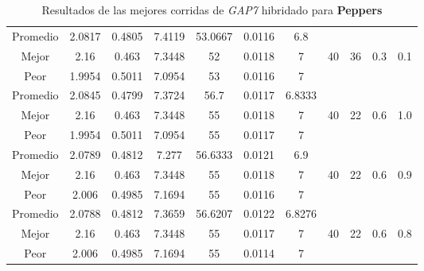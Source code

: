 \begin{table}[h!]
\begin{center}
\begin{tabular}{|c|c|c|c|c|c|c|c|c|c|c|}
        \hline
        \hline
            Promedio  & 2.0817 & 0.4805 & 7.4119 & 53.0667 & 0.0116 & 6.8 &  &  &  & \\
            \cline{1-7}
            Mejor & 2.16 & 0.463  & 7.3448 & 52 & 0.0118 & 7 & 40 & 36 & 0.3 & 0.1\\
            \cline{1-7}
            Peor & 1.9954 & 0.5011  & 7.0954 & 53 & 0.0116 & 7 &  &  &  & \\
        \hline
        \hline
            Promedio  & 2.0845 & 0.4799 & 7.3724 & 56.7 & 0.0117 & 6.8333 &  &  &  & \\
            \cline{1-7}
            Mejor & 2.16 & 0.463  & 7.3448 & 55 & 0.0118 & 7 & 40 & 22 & 0.6 & 1.0\\
            \cline{1-7}
            Peor & 1.9954 & 0.5011  & 7.0954 & 55 & 0.0117 & 7 &  &  &  & \\
        \hline
        \hline
            Promedio  & 2.0789 & 0.4812 & 7.277 & 56.6333 & 0.0121 & 6.9 &  &  &  & \\
            \cline{1-7}
            Mejor & 2.16 & 0.463  & 7.3448 & 55 & 0.0118 & 7 & 40 & 22 & 0.6 & 0.9\\
            \cline{1-7}
            Peor & 2.006 & 0.4985  & 7.1694 & 55 & 0.0116 & 7 &  &  &  & \\
        \hline
        \hline
            Promedio  & 2.0788 & 0.4812 & 7.3659 & 56.6207 & 0.0122 & 6.8276 &  &  &  & \\
            \cline{1-7}
            Mejor & 2.16 & 0.463  & 7.3448 & 55 & 0.0117 & 7 & 40 & 22 & 0.6 & 0.8\\
            \cline{1-7}
            Peor & 2.006 & 0.4985  & 7.1694 & 55 & 0.0114 & 7 &  &  &  & \\
        \hline
        \end{tabular}
        \caption{Resultados de las mejores corridas de \emph{GAP7} hibridado para {\bf Peppers}}
        \label{tb:tableGAP7}
    \end{center}
\end{table}
